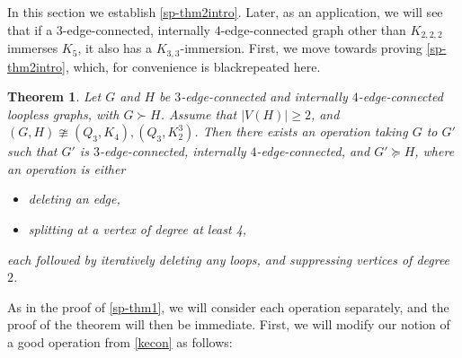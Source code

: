 \documentclass[letterpaper,11pt]{article}
\newtheorem{theorem}{Theorem}[section]
\theoremstyle{definition}
\newcommand{\col}{black}
\begin{document}
In this section we establish \cref{sp-thm2intro}. Later, as an application, we will see that if a $3$-edge-connected, internally $4$-edge-connected graph other than $K_{2,2,2}$ immerses $K_5$, it also has a $K_{3,3}$-immersion. First, we move towards proving \cref{sp-thm2intro}, which, for convenience is {\color \col{repeated}} here.
\begin{theorem}
\label{sp-thm2}
Let $G$ and $H$ be $3$-edge-connected and internally $4$-edge-connected loopless graphs, with $G \succ H$. Assume that $|V(H)|\ge 2$, and $(G, H) \ncong (Q_3, K_4), (Q_3, K_2^3)$. Then there exists an operation taking $G$ to $G'$ such that $G'$ is $3$-edge-connected, internally $4$-edge-connected, and $G' \succeq   H$, where an operation is either
\begin{itemize}
\item deleting an edge,
\item splitting at a vertex of degree at least 4,
\end{itemize}
each followed by iteratively deleting any loops, and suppressing vertices of degree $2$.
\end{theorem}
As in the proof of \cref{sp-thm1}, we will consider each operation separately, and the proof of the theorem will then be immediate. First, we will modify our notion of a good operation from \cref{kecon} as follows:
\end{document}
